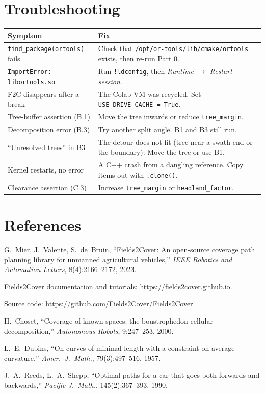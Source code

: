 \documentclass[11pt,a4paper]{article}
\newcommand{\code}[1]{\texttt{\small #1}}
\begin{document}
\section{Troubleshooting}
\begin{tabularx}{\linewidth}{@{}lX@{}}
\toprule
\textbf{Symptom} & \textbf{Fix}\\
\midrule
\code{find\_package(ortools)} fails & Check that \code{/opt/or-tools/lib/cmake/ortools} exists, then re-run Part 0.\\
\code{ImportError: libortools.so} & Run \code{!ldconfig}, then \emph{Runtime $\rightarrow$ Restart session}.\\
F2C disappears after a break & The Colab VM was recycled. Set \code{USE\_DRIVE\_CACHE = True}.\\
Tree-buffer assertion (B.1) & Move the tree inwards or reduce \code{tree\_margin}.\\
Decomposition error (B.3) & Try another split angle. B1 and B3 still run.\\
``Unresolved trees'' in B3 & The detour does not fit (tree near a swath end or the boundary). Move the tree or use B1.\\
Kernel restarts, no error & A C++ crash from a dangling reference. Copy items out with \code{.clone()}.\\
Clearance assertion (C.3) & Increase \code{tree\_margin} or \code{headland\_factor}.\\
\bottomrule
\end{tabularx}

\section*{References}
\begin{enumerate}[label={[\arabic*]},nosep]
  \item G.~Mier, J.~Valente, S.~de~Bruin, ``Fields2Cover: An open-source coverage path planning library for unmanned
        agricultural vehicles,'' \emph{IEEE Robotics and Automation Letters}, 8(4):2166--2172, 2023.
  \item Fields2Cover documentation and tutorials: \url{https://fields2cover.github.io}.
  \item Source code: \url{https://github.com/Fields2Cover/Fields2Cover}.
  \item H.~Choset, ``Coverage of known spaces: the boustrophedon cellular decomposition,'' \emph{Autonomous Robots}, 9:247--253, 2000.
  \item L.~E.~Dubins, ``On curves of minimal length with a constraint on average curvature,'' \emph{Amer.\ J.\ Math.}, 79(3):497--516, 1957.
  \item J.~A.~Reeds, L.~A.~Shepp, ``Optimal paths for a car that goes both forwards and backwards,'' \emph{Pacific J.\ Math.}, 145(2):367--393, 1990.
\end{enumerate}
\end{document}
